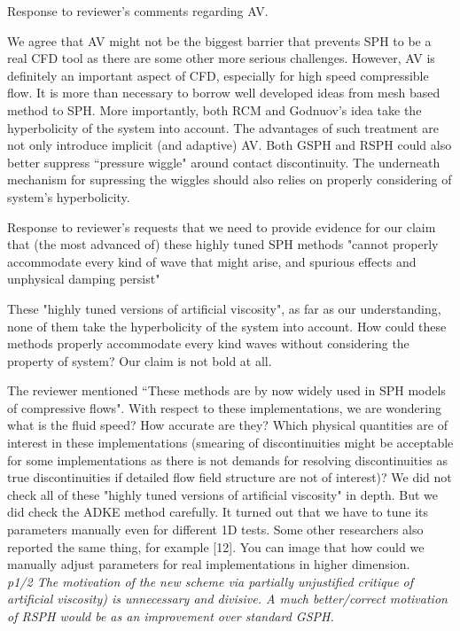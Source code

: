 \documentclass[10pt,a4paper]{article}
\begin{document}
Response to reviewer's comments regarding AV.

We agree that AV might not be the biggest barrier that prevents SPH to be a real CFD tool as there are some other more serious challenges. However, AV is definitely an important aspect of CFD, especially for high speed compressible flow. It is more than necessary to borrow well developed ideas from mesh based method to SPH.
More importantly, both RCM and Godnuov's idea take the hyperbolicity of the system into account. The advantages of such treatment are not only introduce implicit (and adaptive) AV. Both GSPH and RSPH could also better suppress ``pressure wiggle" around contact discontinuity. The underneath mechanism for supressing the wiggles should also relies on properly considering of system's hyperbolicity.

Response to reviewer's requests that we need to provide evidence for our claim that (the most advanced of) these highly tuned SPH methods "cannot properly accommodate every kind of wave that might arise, and spurious effects and unphysical damping persist"

These "highly tuned versions of artificial viscosity", as far as our understanding, none of them take the hyperbolicity of the system into account. How could these methods properly accommodate every kind waves without considering the property of system? Our claim is not bold at all.

The reviewer mentioned ``These methods are by now widely used in SPH models of compressive flows". With respect to these implementations, we are wondering what is the fluid speed? How accurate are they? Which physical quantities are of interest in these implementations (smearing of discontinuities might be acceptable for some implementations as there is not demands for resolving discontinuities as true discontinuities if detailed flow field structure are not of interest)?
We did not check all of these "highly tuned versions of artificial viscosity" in depth. But we did check the ADKE method carefully. It turned out that we have to tune its parameters manually even for different 1D tests. Some other researchers also reported the same thing, for example [12]. You can image that how could we manually adjust parameters for real implementations in higher dimension.
\\[3pt]
 
\textit{p1/2 The motivation of the new scheme via partially unjustified critique of artificial viscosity) is unnecessary and divisive. A much
better/correct motivation of RSPH would be as an improvement over standard GSPH.}
\end{document}
